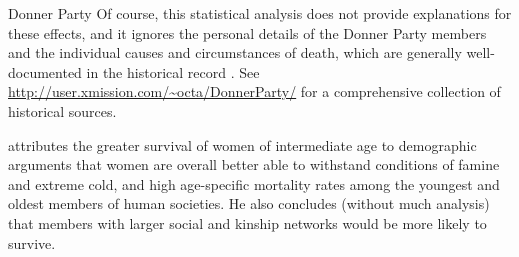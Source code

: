 \documentclass[11pt]{book}\usepackage[]{graphicx}\usepackage[]{color}
\begin{document}
\begin{Example}[donner1]{Donner Party}
Of course, this statistical analysis does not provide explanations for these
effects, and it ignores the personal details of the Donner Party members and
the individual causes and circumstances of death, which are generally well-documented in the historical record \citep{Johnson:1996}.  See \url{http://user.xmission.com/~octa/DonnerParty/} for a comprehensive collection of historical sources.

\citet{Grayson:1990} attributes the greater survival of women of intermediate age to  
demographic arguments that women are overall better able to withstand conditions
of famine and extreme cold, and high age-specific mortality rates among the
youngest and oldest members of human societies.  He also concludes
(without much analysis) that members with larger social and kinship networks
would be more likely to survive.
\end{Example}
\end{document}
